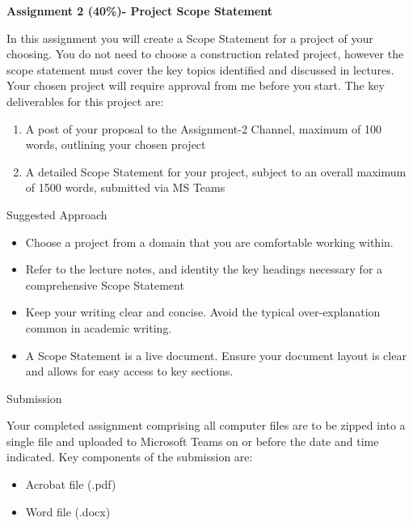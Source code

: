 

	
\begin{flushleft}
\Large\textbf{Assignment 2 (40\%)- Project Scope Statement}\\
\end{flushleft}

In this assignment you will create a Scope Statement for a project of your choosing.  You do not need to choose a construction related project, however the scope statement must cover the key topics identified and discussed in lectures.  Your chosen project will require approval from me before you start.  The key deliverables for this project are:

\begin{enumerate}
	\item A post of your proposal to the Assignment-2 Channel, maximum of 100 words, outlining your chosen project
	\item A detailed Scope Statement for your project, subject to an overall maximum of 1500 words, submitted via MS Teams
\end{enumerate}

\begin{large}
Suggested Approach
\end{large}


\begin{itemize}
	\item Choose a project from a domain that you are comfortable working within.  
	\item Refer to the lecture notes, and identity the key headings necessary for a comprehensive Scope Statement
	\item Keep your writing clear and concise.  Avoid the typical over-explanation common in academic writing.
	\item A Scope Statement is a live document.  Ensure your document layout is clear and allows for easy access to key sections. 

\end{itemize}

\begin{large}
Submission
\end{large}


Your completed assignment comprising all computer files are to be zipped into a single file and uploaded to Microsoft Teams on or before the date and time indicated.  Key components of the submission are:
\begin{itemize}
	\item Acrobat file (.pdf)
	\item Word file (.docx)
\end{itemize}


